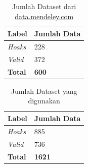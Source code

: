 \begin{table}
    \caption{Jumlah Dataset dari \url{data.mendeley.com}}
    \label{tab:dataset_mendeley}
    \centering
    \begin{tabular}{ | l | l | }
        \hline
        \textbf{Label} & \textbf{Jumlah Data} \\ \hline
        \textit{Hoaks} & 228                  \\ \hline
        \textit{Valid} & 372                  \\ \hline
        \textbf{Total} & \textbf{600}         \\ \hline
    \end{tabular}
\end{table}

\begin{table}
    \caption{Jumlah Dataset yang digunakan}
    \label{tab:dataset}
    \centering
    \begin{tabular}{ | l | l | }
        \hline
        \textbf{Label} & \textbf{Jumlah Data} \\ \hline
        \textit{Hoaks} & 885                  \\ \hline
        \textit{Valid} & 736                  \\ \hline
        \textbf{Total} & \textbf{1621}        \\ \hline
    \end{tabular}
\end{table}


